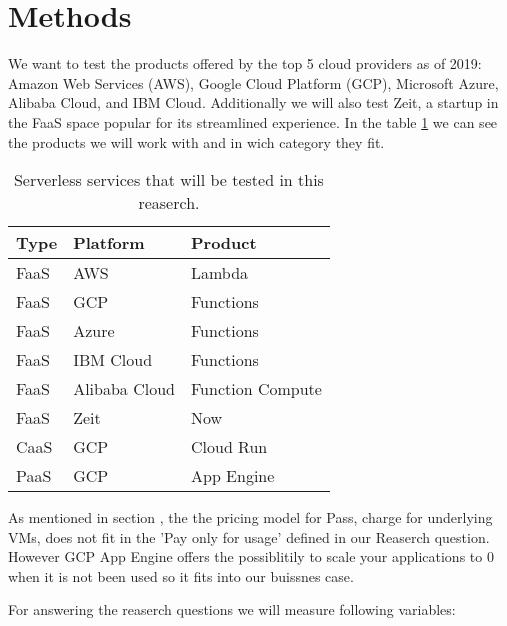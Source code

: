 \documentclass[11pt]{article}
\begin{document}


\section{Methods}
\label{methods}
We want to test the products offered by the top 5 cloud providers as of 2019: Amazon Web Services (AWS), Google Cloud Platform (GCP), Microsoft Azure, Alibaba Cloud, and IBM Cloud. Additionally we will also test Zeit, a startup in the FaaS space popular for its streamlined experience. In the table \ref{Tab:services} we can see the products we will work with and in wich category they fit. \\

\begin{table}
\centering
 \begin{tabularx}{\textwidth}{ X  X  X }
 \textbf{Type} & \textbf{Platform} & \textbf{Product} \\  
 \hline
 \hline
 FaaS & AWS & Lambda \\  
 \hline
 FaaS & GCP & Functions \\  
 \hline
 FaaS & Azure & Functions \\ 
 \hline
 FaaS & IBM Cloud & Functions \\ 
 \hline
 FaaS & Alibaba Cloud & Function Compute \\ 
 \hline
 FaaS & Zeit & Now \\ 
 \hline
 CaaS & GCP & Cloud Run \\ 
 \hline
 PaaS & GCP & App Engine \\ 

\end{tabularx}
\caption{Serverless services that will be tested in this reaserch.}
\label{Tab:services}
\end{table}

As mentioned in section \label{introduction}, the the pricing model for Pass, charge for underlying VMs, does not fit in the 'Pay only for usage' defined in our Reaserch question. However GCP App Engine offers the possiblitily to scale your applications to 0 when it is not been used so it fits into our buissnes case.  




For answering the reaserch questions we will measure following variables:
\end{document}
